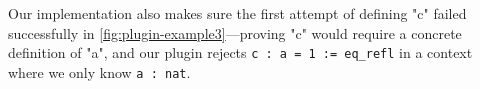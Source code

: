 Our implementation also makes sure the first attempt of defining "c"
failed successfully in \cref{fig:plugin-example3}---proving "c"
would require a concrete definition of "a", and our plugin rejects
\texttt{c : a = 1 := eq_refl} in a context where we
only know \texttt{a : nat}.








